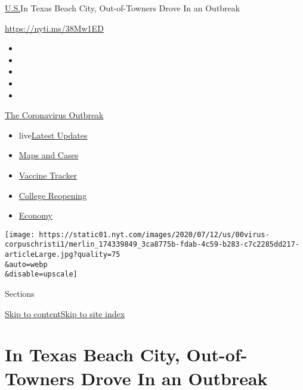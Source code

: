 \href{/section/us}{U.S.}\textbar{}In Texas Beach City, Out-of-Towners
Drove In an Outbreak

\url{https://nyti.ms/38Mw1ED}

\begin{itemize}
\item
\item
\item
\item
\item
\end{itemize}

\href{https://www.nytimes.com/news-event/coronavirus?action=click\&pgtype=Article\&state=default\&region=TOP_BANNER\&context=storylines_menu}{The
Coronavirus Outbreak}

\begin{itemize}
\tightlist
\item
  live\href{https://www.nytimes.com/2020/08/04/world/coronavirus-covid-19.html?action=click\&pgtype=Article\&state=default\&region=TOP_BANNER\&context=storylines_menu}{Latest
  Updates}
\item
  \href{https://www.nytimes.com/interactive/2020/us/coronavirus-us-cases.html?action=click\&pgtype=Article\&state=default\&region=TOP_BANNER\&context=storylines_menu}{Maps
  and Cases}
\item
  \href{https://www.nytimes.com/interactive/2020/science/coronavirus-vaccine-tracker.html?action=click\&pgtype=Article\&state=default\&region=TOP_BANNER\&context=storylines_menu}{Vaccine
  Tracker}
\item
  \href{https://www.nytimes.com/2020/08/02/us/covid-college-reopening.html?action=click\&pgtype=Article\&state=default\&region=TOP_BANNER\&context=storylines_menu}{College
  Reopening}
\item
  \href{https://www.nytimes.com/live/2020/08/03/business/stock-market-today-coronavirus?action=click\&pgtype=Article\&state=default\&region=TOP_BANNER\&context=storylines_menu}{Economy}
\end{itemize}

\texttt{[image: https://static01.nyt.com/images/2020/07/12/us/00virus-corpuschristi1/merlin\_174339849\_3ca8775b-fdab-4c59-b283-c7c2285dd217-articleLarge.jpg?quality=75\\\&auto=webp\\\&disable=upscale]}

Sections

\protect\hyperlink{site-content}{Skip to
content}\protect\hyperlink{site-index}{Skip to site index}

\hypertarget{in-texas-beach-city-out-of-towners-drove-in-an-outbreak}{%
\section{In Texas Beach City, Out-of-Towners Drove In an
Outbreak}\label{in-texas-beach-city-out-of-towners-drove-in-an-outbreak}}

